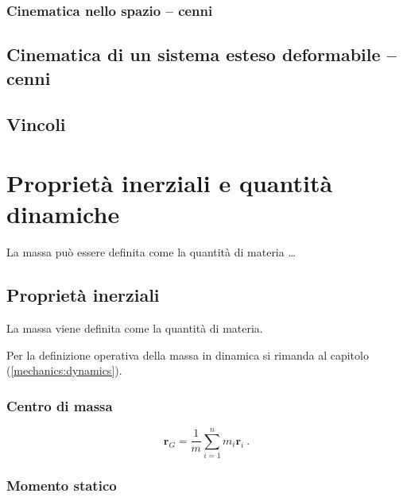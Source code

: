 \subsection{Cinematica nello spazio -- cenni}

\section{Cinematica di un sistema esteso deformabile -- cenni}

\section{Vincoli}\label{mechanics:kinematics:constraints}

\chapter{Proprietà inerziali e quantità dinamiche}
La massa può essere definita come la quantità di materia \dots

\section{Proprietà inerziali}

\begin{definition}[Massa] La massa viene definita come la quantità di materia.
\end{definition}
{\color{red} Per la definizione operativa della massa in dinamica si rimanda al capitolo (\ref{mechanics:dynamics}).}

\subsection{Centro di massa}
\begin{equation}
    \mathbf{r}_G = \dfrac{1}{m} \sum_{i=1}^n m_i \mathbf{r}_i \ .
\end{equation}
\subsection{Momento statico}
